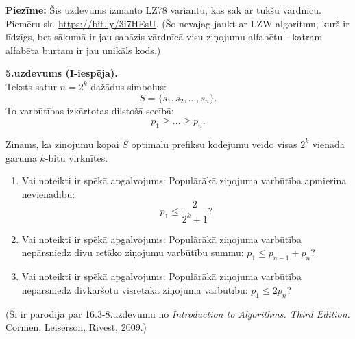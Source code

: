 \documentclass[a4paper,12pt]{article}
\begin{document}
{\bf Piezīme:} Šis uzdevums izmanto LZ78 variantu, kas sāk ar tukšu vārdnīcu. 
Piemēru sk. \url{https://bit.ly/3i7HEsU}. 
(Šo nevajag jaukt ar LZW algoritmu, kurš ir līdzīgs, bet sākumā ir jau sabāzis vārdnīcā 
visu ziņojumu alfabētu - katram alfabēta burtam ir jau unikāls kods.)




\vspace{10pt}
{\bf 5.uzdevums (I-iespēja).}\\
Teksts satur $n = 2^k$ dažādus simbolus:
$$S = \{ s_1,s_2,\ldots,s_n \}.$$
To
varbūtības izkārtotas dilstošā secībā:
$$p_1 \geq \ldots \geq p_n.$$

Zināms, ka ziņojumu kopai $S$
optimālu prefiksu ko\-dē\-ju\-mu veido visas
$2^k$ vienāda garuma $k$-bitu virk\-nī\-tes.

\begin{enumerate}[label=(\alph*)]
\item Vai noteikti ir spēkā apgalvojums: Populārākā ziņojuma varbūtība
apmierina nevienādību:
$${\displaystyle p_1 \leq \frac{2}{2^k + 1}}?$$
\item Vai noteikti ir spēkā apgalvojums: Populārākā ziņojuma varbūtība
nepārsniedz divu retāko ziņojumu varbūtību summu: $p_1 \leq p_{n-1} + p_{n}$?
\item Vai noteikti ir spēkā apgalvojums: Populārākā ziņojuma varbūtība
nepārsniedz divkāršotu visretākā ziņojuma varbūtību: $p_1 \leq 2p_n$?
\end{enumerate}

(Šī ir parodija par 16.3-8.uzdevumu no {\em Introduction to Algorithms. Third Edition.} Cormen, Leiserson, Rivest, 2009.)











\end{document}
